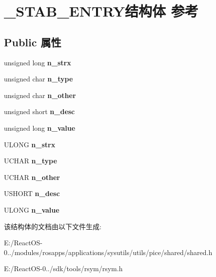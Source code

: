 \hypertarget{struct___s_t_a_b___e_n_t_r_y}{}\section{\+\_\+\+S\+T\+A\+B\+\_\+\+E\+N\+T\+R\+Y结构体 参考}
\label{struct___s_t_a_b___e_n_t_r_y}
\subsection*{Public 属性}
\begin{DoxyCompactItemize}
\item 
\mbox{\label{struct___s_t_a_b___e_n_t_r_y_a8d4849002d475363db3f6ae643aa471b}} 
unsigned long {\bfseries n\+\_\+strx}
\item 
\mbox{\label{struct___s_t_a_b___e_n_t_r_y_ad2f36319eca68cb025c5a4d2dc0c5aec}} 
unsigned char {\bfseries n\+\_\+type}
\item 
\mbox{\label{struct___s_t_a_b___e_n_t_r_y_ada21186a1c452019104e5ce3ffc22aac}} 
unsigned char {\bfseries n\+\_\+other}
\item 
\mbox{\label{struct___s_t_a_b___e_n_t_r_y_a1113fcdd7267b81fd7553d2ae459f9d9}} 
unsigned short {\bfseries n\+\_\+desc}
\item 
\mbox{\label{struct___s_t_a_b___e_n_t_r_y_a66e323bd771b4101dbcc1f5ad4cdb1e2}} 
unsigned long {\bfseries n\+\_\+value}
\item 
\mbox{\label{struct___s_t_a_b___e_n_t_r_y_ae36f8b13825411beb599236c6d7f9f66}} 
U\+L\+O\+NG {\bfseries n\+\_\+strx}
\item 
\mbox{\label{struct___s_t_a_b___e_n_t_r_y_ae152eb9bc84cae0a92a0709961a4247b}} 
U\+C\+H\+AR {\bfseries n\+\_\+type}
\item 
\mbox{\label{struct___s_t_a_b___e_n_t_r_y_aef12a14a776ae8c44c32a68dba1fd8ab}} 
U\+C\+H\+AR {\bfseries n\+\_\+other}
\item 
\mbox{\label{struct___s_t_a_b___e_n_t_r_y_a8a745904fa790c051ccd69f2420cc5c2}} 
U\+S\+H\+O\+RT {\bfseries n\+\_\+desc}
\item 
\mbox{\label{struct___s_t_a_b___e_n_t_r_y_ae2d0fc396b9cabec4e596f2601eb8e02}} 
U\+L\+O\+NG {\bfseries n\+\_\+value}
\end{DoxyCompactItemize}


该结构体的文档由以下文件生成\+:\begin{DoxyCompactItemize}
\item 
E\+:/\+React\+O\+S-\/0../modules/rosapps/applications/sysutils/utils/pice/shared/shared.\+h\item 
E\+:/\+React\+O\+S-\/0../sdk/tools/rsym/rsym.\+h\end{DoxyCompactItemize}
